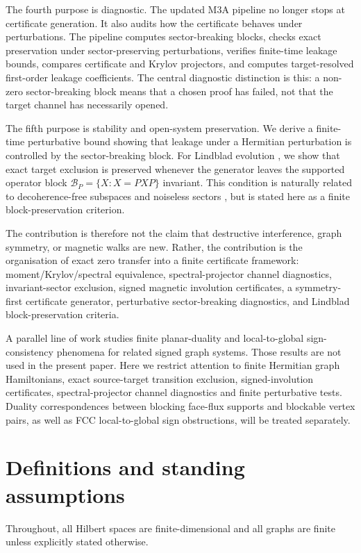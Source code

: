 \documentclass[11pt]{article}
\theoremstyle{definition}
\begin{document}
The fourth purpose is diagnostic. The updated M3A pipeline no longer stops at certificate generation. It also audits how the certificate behaves under perturbations. The pipeline computes sector-breaking blocks, checks exact preservation under sector-preserving perturbations, verifies finite-time leakage bounds, compares certificate and Krylov projectors, and computes target-resolved first-order leakage coefficients. The central diagnostic distinction is this: a non-zero sector-breaking block means that a chosen proof has failed, not that the target channel has necessarily opened.

The fifth purpose is stability and open-system preservation. We derive a finite-time perturbative bound showing that leakage under a Hermitian perturbation is controlled by the sector-breaking block. For Lindblad evolution \citep{Gorini1976,Lindblad1976}, we show that exact target exclusion is preserved whenever the generator leaves the supported operator block $\mathcal B_P=\{X:X=PXP\}$ invariant. This condition is naturally related to decoherence-free subspaces and noiseless sectors \citep{LidarWhaley2003}, but is stated here as a finite block-preservation criterion.

The contribution is therefore not the claim that destructive interference, graph symmetry, or magnetic walks are new. Rather, the contribution is the organisation of exact zero transfer into a finite certificate framework: moment/Krylov/spectral equivalence, spectral-projector channel diagnostics, invariant-sector exclusion, signed magnetic involution certificates, a symmetry-first certificate generator, perturbative sector-breaking diagnostics, and Lindblad block-preservation criteria.

A parallel line of work studies finite planar-duality and local-to-global sign-consistency phenomena for related signed graph systems. Those results are not used in the present paper. Here we restrict attention to finite Hermitian graph Hamiltonians, exact source-target transition exclusion, signed-involution certificates, spectral-projector channel diagnostics and finite perturbative tests. Duality correspondences between blocking face-flux supports and blockable vertex pairs, as well as FCC local-to-global sign obstructions, will be treated separately.

\section{Definitions and standing assumptions}
Throughout, all Hilbert spaces are finite-dimensional and all graphs are finite unless explicitly stated otherwise.
\end{document}
